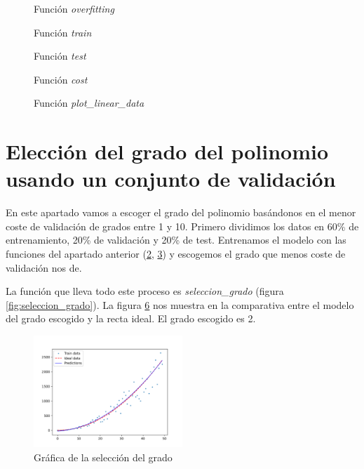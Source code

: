 \documentclass[6pt]{AiTex}
\begin{document}
\begin{figure}[H]
    \centering
    
    \caption{Función \textit{overfitting}}
    \label{fig:overfitting}
\end{figure}

\begin{figure}[H]
    \centering
    
    \caption{Función \textit{train}}
    \label{fig:train}
\end{figure}

\begin{figure}[H]
    \centering
    
    \caption{Función \textit{test}}
    \label{fig:test}
\end{figure}

\begin{figure}[H]
    \centering
    
    \caption{Función \textit{cost}}
    \label{fig:cost}
\end{figure}

\begin{figure}[H]
    \centering
    
    \caption{Función \textit{plot\_linear\_data}}
    \label{fig:plot_linear_data}
\end{figure}

\section{Elección del grado del polinomio usando un conjunto de validación}

En este apartado vamos a escoger el grado del polinomio basándonos en el menor coste de validación de grados entre 1 y 10. Primero dividimos los datos en 60\% de entrenamiento, 20\% de validación y 20\% de test. Entrenamos el modelo con las funciones del apartado anterior (\ref{fig:train}, \ref{fig:test}) y escogemos el grado que menos coste de validación nos de.

La función que lleva todo este proceso es \textit{seleccion\_grado} (figura \ref{fig:seleccion_grado}). La figura \ref{fig:seleccion_grado_plot} nos muestra en la comparativa entre el modelo del grado escogido y la recta ideal. El grado escogido es 2.

\begin{figure}[H]
    \centering
    \includegraphics[width=0.5\textwidth]{./images/grado.png}
    \caption{Gráfica de la selección del grado}
    \label{fig:seleccion_grado_plot}
\end{figure}
\end{document}
